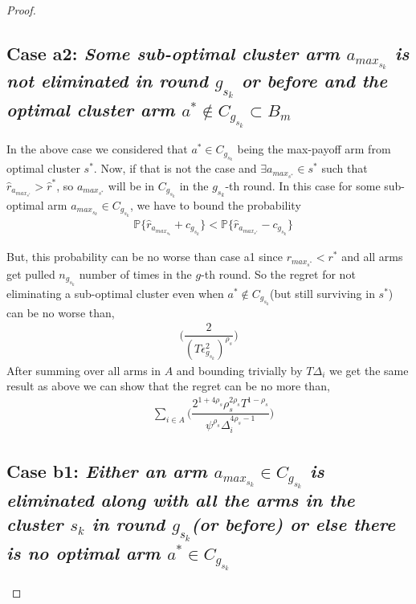 \begin{proof}
\subsection*{Case a2: \textit{ Some sub-optimal cluster arm $a_{max_{s_{k}}}$ is not eliminated in round $g_{s_{k}}$ or before and the optimal cluster arm $a^{*}\notin C_{g_{s_{k}}} \subset B_{m}$ }}
	
	In the above case we considered that $a^{*}\in C_{g_{s_{k}}}$ being the max-payoff arm from optimal cluster $s^{*}$. Now, if that is not the case and $\exists a_{max_{s^{*}}}\in s^{*}$ such that $\hat{r}_{a_{max_{s^{*}}}}> \hat{r}^{*}$, so $a_{max_{s^{*}}}$ will be in $C_{g_{s_{k}}}$ in the $g_{s_{k}}$-th round. In this case for some sub-optimal arm $a_{max_{s_{k}}}\in C_{g_{s_{k}}}$, we have to bound the probability
	\begin{align*}
	&\mathbb{P}\bigg\lbrace\hat{r}_{a_{max_{s_{k}}}}+c_{g_{s_{k}}}\bigg\rbrace< \mathbb{P}\bigg\lbrace\hat{r}_{a_{max_{s^{*}}}}-c_{g_{s_{k}}}\bigg\rbrace
	\end{align*}		 
	 
	 
	 But, this probability can be no worse than case a1 since $r_{max_{s^{*}}} < r^{*}$ and all arms get pulled $n_{g_{s_{k}}}$ number of times in the $g$-th round. So the regret for not eliminating a sub-optimal cluster even when $a^{*}\notin C_{g_{s_{k}}}$(but still surviving in $s^{*}$) can be no worse than,
	 \begin{align*} 
	 \bigg(\dfrac{2}{(T\epsilon_{g_{s_{k}}}^{2})^{\rho_{s}}}\bigg) 
	 \end{align*}
	 After summing over all arms in $A$ and bounding 
trivially by $T\Delta_{i}$ we get the same result as above we can show that the regret can be no more than,
 \begin{align*}
 &\sum_{i\in A}\bigg(\dfrac{2^{1+4\rho_{s}}\rho_{s}^{2\rho_{s}}T^{1-\rho_{s}}}{\psi^{\rho_{s}}\Delta_{i}^{4\rho_{s}-1}}\bigg)
 \end{align*}


\subsection*{Case b1: \textit {Either an arm $a_{max_{s_{k}}}\in C_{g_{s_{k}}}$ is eliminated along with all the arms in the cluster $s_{k}$ in round $g_{s_{k}}$(or before) or else there is no optimal arm $a^{*}\in C_{g_{s_{k}}}$} }
	

\end{proof}
